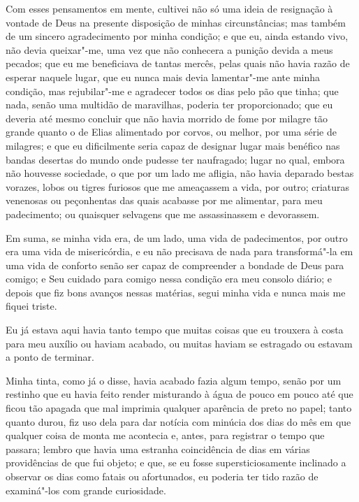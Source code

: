 Com esses pensamentos em mente, cultivei não só uma ideia de resignação
à vontade de Deus na presente disposição de minhas circunstâncias; mas
também de um sincero agradecimento por minha condição; e que eu, ainda
estando vivo, não devia queixar"-me, uma vez que não conhecera a punição
devida a meus pecados; que eu me beneficiava de tantas mercês, pelas
quais não havia razão de esperar naquele lugar, que eu nunca mais devia
lamentar"-me ante minha condição, mas rejubilar"-me e agradecer todos os
dias pelo pão que tinha; que nada, senão uma multidão de maravilhas,
poderia ter proporcionado; que eu deveria até mesmo concluir que não
havia morrido de fome por milagre tão grande quanto o de Elias
alimentado por corvos, ou melhor, por uma série de milagres; e que eu
dificilmente seria capaz de designar lugar mais benéfico nas bandas
desertas do mundo onde pudesse ter naufragado; lugar no qual, embora não
houvesse sociedade, o que por um lado me afligia, não havia deparado
bestas vorazes, lobos ou tigres furiosos que me ameaçassem a vida, por
outro; criaturas venenosas ou peçonhentas das quais acabasse por me
alimentar, para meu padecimento; ou quaisquer selvagens que me
assassinassem e devorassem.

Em suma, se minha vida era, de um lado, uma vida de padecimentos, por
outro era uma vida de misericórdia, e eu não precisava de nada para
transformá"-la em uma vida de conforto senão ser capaz de compreender a
bondade de Deus para comigo; e Seu cuidado para comigo nessa condição
era meu consolo diário; e depois que fiz bons avanços nessas matérias,
segui minha vida e nunca mais me fiquei triste.

Eu já estava aqui havia tanto tempo que muitas coisas que eu trouxera à
costa para meu auxílio ou haviam acabado, ou muitas haviam se estragado
ou estavam a ponto de terminar.

Minha tinta, como já o disse, havia acabado fazia algum tempo, senão por
um restinho que eu havia feito render misturando à água de pouco em
pouco até que ficou tão apagada que mal imprimia qualquer aparência de
preto no papel; tanto quanto durou, fiz uso dela para dar notícia com
minúcia dos dias do mês em que qualquer coisa de monta me acontecia e,
antes, para registrar o tempo que passara; lembro que havia uma estranha
coincidência de dias em várias providências de que fui objeto; e que, se
eu fosse supersticiosamente inclinado a observar os dias como fatais ou
afortunados, eu poderia ter tido razão de examiná"-los com grande
curiosidade.

